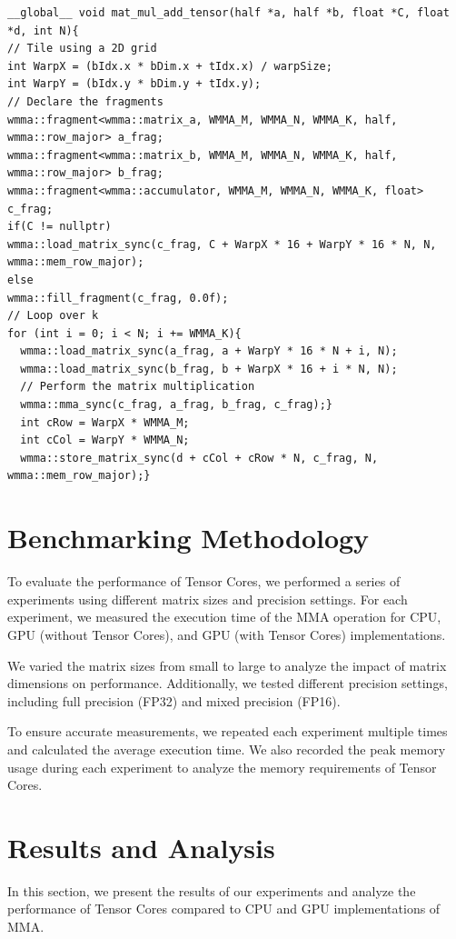 \documentclass[conference]{IEEEtran}
\begin{document}
  \begin{lstlisting}
__global__ void mat_mul_add_tensor(half *a, half *b, float *C, float *d, int N){
// Tile using a 2D grid
int WarpX = (bIdx.x * bDim.x + tIdx.x) / warpSize;
int WarpY = (bIdx.y * bDim.y + tIdx.y);
// Declare the fragments
wmma::fragment<wmma::matrix_a, WMMA_M, WMMA_N, WMMA_K, half, wmma::row_major> a_frag;
wmma::fragment<wmma::matrix_b, WMMA_M, WMMA_N, WMMA_K, half, wmma::row_major> b_frag;
wmma::fragment<wmma::accumulator, WMMA_M, WMMA_N, WMMA_K, float> c_frag;
if(C != nullptr)
wmma::load_matrix_sync(c_frag, C + WarpX * 16 + WarpY * 16 * N, N, wmma::mem_row_major);
else
wmma::fill_fragment(c_frag, 0.0f);
// Loop over k
for (int i = 0; i < N; i += WMMA_K){
  wmma::load_matrix_sync(a_frag, a + WarpY * 16 * N + i, N);
  wmma::load_matrix_sync(b_frag, b + WarpX * 16 + i * N, N);
  // Perform the matrix multiplication
  wmma::mma_sync(c_frag, a_frag, b_frag, c_frag);}
  int cRow = WarpX * WMMA_M;
  int cCol = WarpY * WMMA_N;
  wmma::store_matrix_sync(d + cCol + cRow * N, c_frag, N, wmma::mem_row_major);}
  \end{lstlisting}


  \section{Benchmarking Methodology}\label{sec:benchmarking-methodology}
  
  To evaluate the performance of Tensor Cores, we performed a series of experiments using different matrix sizes and precision settings. For each experiment, we measured the execution time of the MMA operation for CPU, GPU (without Tensor Cores), and GPU (with Tensor Cores) implementations.
  
  We varied the matrix sizes from small to large to analyze the impact of matrix dimensions on performance. Additionally, we tested different precision settings, including full precision (FP32) and mixed precision (FP16).
  
  To ensure accurate measurements, we repeated each experiment multiple times and calculated the average execution time. We also recorded the peak memory usage during each experiment to analyze the memory requirements of Tensor Cores.
  
  \section{Results and Analysis}\label{sec:results-analysis}
  
  In this section, we present the results of our experiments and analyze the performance of Tensor Cores compared to CPU and GPU implementations of MMA.
  
\end{document}
